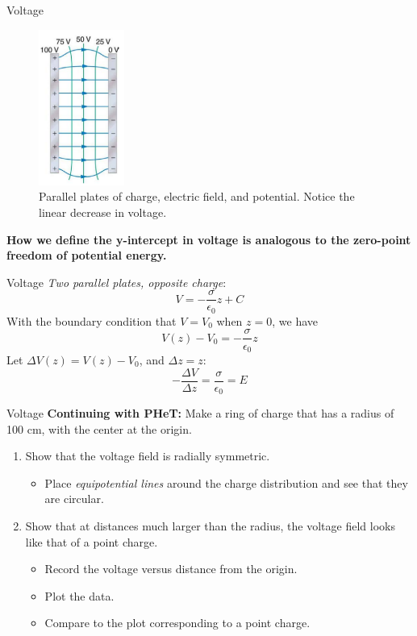 \documentclass{beamer}
\begin{document}
\begin{frame}{Voltage}
\begin{figure}
\centering
\includegraphics[width=0.25\textwidth]{figures/plates.png}
\caption{\label{fig:plates} Parallel plates of charge, electric field, and potential.  Notice the linear decrease in voltage.}
\end{figure}
\textbf{How we define the y-intercept in voltage is analogous to the zero-point freedom of potential energy.}
\end{frame}

\begin{frame}{Voltage}
\textit{Two parallel plates, opposite charge}:
\begin{equation}
V = -\frac{\sigma}{\epsilon_0}z + C
\end{equation}
With the boundary condition that $V = V_0$ when $z = 0$, we have
\begin{equation}
V(z) - V_0 = -\frac{\sigma}{\epsilon_0}z
\end{equation}
Let $\Delta V(z) = V(z) - V_0$, and $\Delta z = z$:
\begin{equation}
-\frac{\Delta V}{\Delta z} = \frac{\sigma}{\epsilon_0} =  E
\end{equation}
\end{frame}

\begin{frame}{Voltage}
\textbf{Continuing with PHeT:} Make a ring of charge that has a radius of 100 cm, with the center at the origin.
\begin{enumerate}
\item Show that the voltage field is radially symmetric.
\begin{itemize}
\item Place \textit{equipotential lines} around the charge distribution and see that they are circular.
\end{itemize}
\item Show that at distances much larger than the radius, the voltage field looks like that of a point charge.
\begin{itemize}
\item Record the voltage versus distance from the origin.
\item Plot the data.
\item Compare to the plot corresponding to a point charge.
\end{itemize}
\end{enumerate} 
\end{frame}
\end{document}
